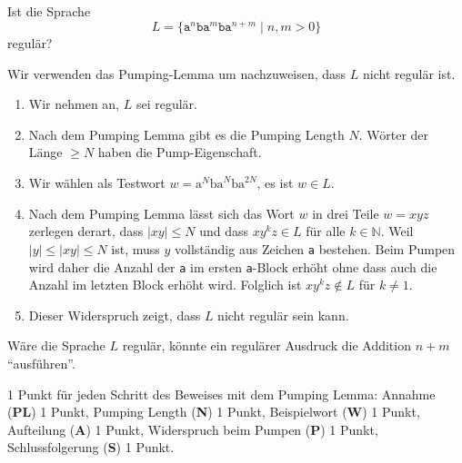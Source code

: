 Ist die Sprache
\[
L=\{\texttt{a}^n\texttt{ba}^m\texttt{ba}^{n+m}\;|\;n,m>0\}
\]
regulär?

\begin{loesung}
Wir verwenden das Pumping-Lemma um nachzuweisen, dass $L$ nicht 
regulär ist.
\begin{enumerate}
\item
Wir nehmen an, $L$ sei regulär.
\item
Nach dem Pumping Lemma gibt es die Pumping Length $N$.
Wörter der Länge $\ge N$ haben die Pump-Eigenschaft.
\item
Wir wählen als Testwort
$w = \text{a}^N\text{ba}^N\text{ba}^{2N}$, es ist $w\in L$.
\item
Nach dem Pumping Lemma lässt sich das Wort $w$ in drei Teile $w=xyz$
zerlegen derart, dass $|xy|\le N$ und dass $xy^kz\in L$ für alle
$k\in\mathbb N$.
Weil $|y| \le |xy|\le N$ ist, muss $y$ vollständig aus Zeichen
\texttt{a} bestehen.
Beim Pumpen wird daher die Anzahl der \texttt{a} im ersten \texttt{a}-Block
erhöht ohne dass auch die Anzahl im letzten Block erhöht wird.
Folglich ist $xy^kz\not\in L$ für $k\ne 1$.
\item
Dieser Widerspruch zeigt, dass $L$ nicht regulär sein kann.
\qedhere
\end{enumerate}
\end{loesung}


\begin{diskussion}
Wäre die Sprache $L$ regulär, könnte ein regulärer Ausdruck die
Addition $n+m$ ``ausführen''.
\end{diskussion}

\begin{bewertung} 1 Punkt für jeden Schritt des Beweises mit dem
Pumping Lemma:
Annahme ({\bf PL}) 1 Punkt,
Pumping Length ({\bf N}) 1 Punkt,
Beispielwort ({\bf W}) 1 Punkt,
Aufteilung ({\bf A}) 1 Punkt,
Widerspruch beim Pumpen ({\bf P}) 1 Punkt,
Schlussfolgerung ({\bf S}) 1 Punkt.
\end{bewertung}

